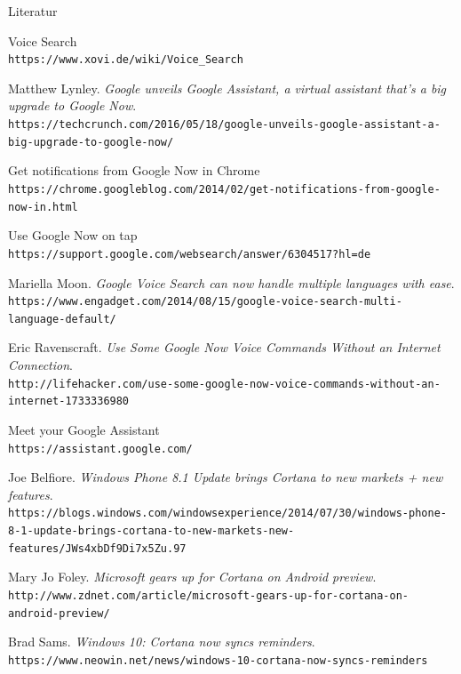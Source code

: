 \documentclass[18pt]{beamer}
\begin{document}
\begin{frame}[allowframebreaks]{Literatur}
\begin{thebibliography}{9}
	Voice Search
	\\\texttt{https://www.xovi.de/wiki/Voice\_Search}
	
	Matthew Lynley.
	\textit{Google unveils Google Assistant, a virtual assistant that’s a big upgrade to Google Now}.
	\\\texttt{https://techcrunch.com/2016/05/18/google-unveils-google-assistant-a-big-upgrade-to-google-now/}
	
	Get notifications from Google Now in Chrome 
	\\\texttt{https://chrome.googleblog.com/2014/02/get-notifications-from-google-now-in.html}
	
	Use Google Now on tap
	\\\texttt{https://support.google.com/websearch/answer/6304517?hl=de}
	
	Mariella Moon.
	\textit{Google Voice Search can now handle multiple languages with ease}.
	\\\texttt{https://www.engadget.com/2014/08/15/google-voice-search-multi-language-default/}
	
	Eric Ravenscraft.
	\textit{Use Some Google Now Voice Commands Without an Internet Connection}.
	\\\texttt{http://lifehacker.com/use-some-google-now-voice-commands-without-an-internet-1733336980}
	
	Meet your Google Assistant
	\\\texttt{https://assistant.google.com/}
	
	Joe Belfiore.
	\textit{Windows Phone 8.1 Update brings Cortana to new markets + new features}.
	\\\texttt{https://blogs.windows.com/windowsexperience/2014/07/30/windows-phone-8-1-update-brings-cortana-to-new-markets-new-features/JWs4xbDf9Di7x5Zu.97}
	
	Mary Jo Foley.
	\textit{Microsoft gears up for Cortana on Android preview}.
	\\\texttt{http://www.zdnet.com/article/microsoft-gears-up-for-cortana-on-android-preview/}
	
	Brad Sams.
	\textit{Windows 10: Cortana now syncs reminders}.
	\\\texttt{https://www.neowin.net/news/windows-10-cortana-now-syncs-reminders}
	

\end{thebibliography}
\end{frame}
\end{document}
